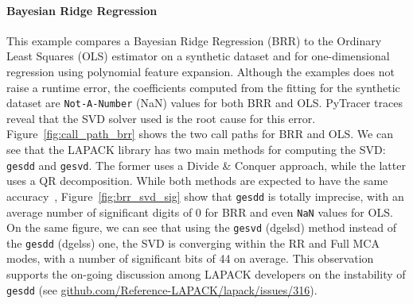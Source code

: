 \documentclass[11pt]{article}
\newcommand{\tristan}[1]{\color{orange}\textbf{From Tristan:} #1\color{black}\xspace}
\newcommand{\pytracer}[0]{PyTracer\xspace}
\begin{document}
\paragraph{Bayesian Ridge Regression}

This example compares a Bayesian Ridge Regression (BRR) to the Ordinary Least Squares (OLS) estimator on a synthetic dataset and for one-dimensional regression using polynomial feature expansion. Although the examples does not raise a runtime error, the coefficients computed from the fitting for the synthetic dataset are \texttt{Not-A-Number} (NaN) values for both BRR and OLS. \pytracer traces reveal that the SVD solver used is the root cause for this error. 
Figure~\ref{fig:call_path_brr} shows the two call paths for BRR and OLS. 
We can see that the LAPACK library has two main methods for computing the SVD: \texttt{gesdd} and \texttt{gesvd}.
The former uses a Divide \& Conquer approach, while the latter uses a QR decomposition. 
While both methods are expected to have the same accuracy~\cite{nakatsukasa2013stable}, Figure~\ref{fig:brr_svd_sig} show that \texttt{gesdd} is totally imprecise, with an average number of significant digits of 0 for BRR and even \texttt{NaN} values for OLS. 
On the same figure, we can see that 
using the \texttt{gesvd} (dgelsd) method instead of the \texttt{gesdd} (dgelss) one, 
the SVD is converging within the RR and Full MCA modes, with a number of significant bits of 44 on average. 
This observation supports the on-going discussion among LAPACK developers on the instability of \texttt{gesdd} (see  \href{https://github.com/Reference-LAPACK/lapack/issues/316}{github.com/Reference-LAPACK/lapack/issues/316}). 

\end{document}

